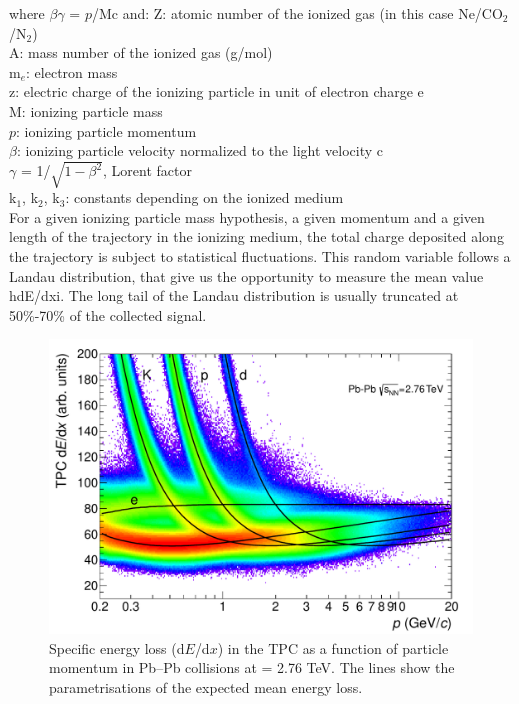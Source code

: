 where $\beta\gamma$ = $\ensuremath{p}$/Mc and:
Z: atomic number of the ionized gas (in this case Ne/CO$_{2}$/N$_{2}$)\\
A: mass number of the ionized gas (g/mol)\\
m$_{e}$: electron mass\\
z: electric charge of the ionizing particle in unit of electron charge e\\
M: ionizing particle mass\\
$\ensuremath{p}$: ionizing particle momentum\\
$\beta$: ionizing particle velocity normalized to the light velocity c\\
$\gamma$ = 1/$\sqrt{1-\beta^{2}}$, Lorent factor\\
k$_{1}$, k$_{2}$, k$_{3}$: constants depending on the ionized medium\\ 


For a given ionizing particle mass hypothesis, a given momentum and a given length of the trajectory in the ionizing medium, the total charge deposited along the trajectory is subject to statistical fluctuations. This random variable follows a Landau distribution, that give us the opportunity to measure the mean value hdE/dxi. The long tail of the Landau distribution is usually truncated at 50\%-70\% of the collected signal. 

\begin{figure}[htbp]
\begin{center}
\includegraphics[width=10.cm]{./Version1/FigChapter4/TPCPID}
\caption{Specific energy loss (d$E$/d$x$) in the TPC as a function of particle momentum in Pb--Pb collisions at \snn= 2.76 TeV. The lines show the parametrisations of the expected mean energy loss.}
\label{fig:tpcpidPbPb}
\end{center}
\end{figure}

